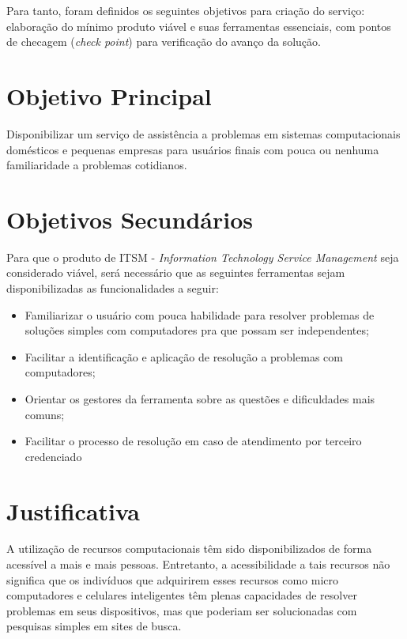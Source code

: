 		Para tanto, foram definidos os seguintes objetivos para criação do serviço: elaboração do mínimo produto viável e suas ferramentas essenciais, com pontos de checagem (\textit{check point}) para verificação do avanço da solução.
	
	\section[Objetivo Principal]{Objetivo Principal}
	
		Disponibilizar um serviço de assistência a problemas em sistemas computacionais domésticos e pequenas empresas para usuários finais com pouca ou nenhuma familiaridade a problemas cotidianos.
	
	\section[Objetivos Secundários]{Objetivos Secundários}
	
		Para que o produto de ITSM - \textit{Information Technology Service Management} seja considerado viável, será necessário que as seguintes ferramentas sejam disponibilizadas as funcionalidades a seguir: 
	
		\begin{itemize}
			
			\item
			Familiarizar o usuário com pouca habilidade para resolver problemas de soluções simples com computadores pra que possam ser independentes;
			
			\item
			Facilitar a identificação e aplicação de resolução a problemas com computadores;
			
			\item
			Orientar os gestores da ferramenta sobre as questões e dificuldades mais comuns;
			
			\item 
			Facilitar o processo de resolução em caso de atendimento por terceiro credenciado
			
		\end{itemize}
	
	\section[Justificativa]{Justificativa}
	
		A utilização de recursos computacionais têm sido disponibilizados de forma acessível a mais e mais pessoas. Entretanto, a acessibilidade a tais recursos não significa que os indivíduos que adquirirem esses recursos como micro computadores e celulares inteligentes têm plenas capacidades de resolver problemas em seus dispositivos, mas que poderiam ser solucionadas com pesquisas simples em sites de busca.
		
